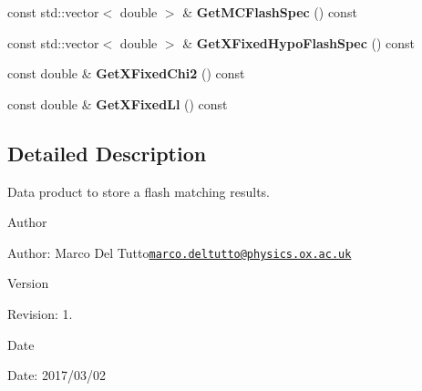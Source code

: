 \begin{DoxyCompactItemize}
\item 
\hypertarget{classubana_1_1FlashMatch_ad55287aa6f9ea080a5c875ea60090ae3}{const std\-::vector$<$ double $>$ \& {\bfseries Get\-M\-C\-Flash\-Spec} () const }\label{classubana_1_1FlashMatch_ad55287aa6f9ea080a5c875ea60090ae3}

\item 
\hypertarget{classubana_1_1FlashMatch_ad674b8ab8efe7f7850cdb5d689429907}{const std\-::vector$<$ double $>$ \& {\bfseries Get\-X\-Fixed\-Hypo\-Flash\-Spec} () const }\label{classubana_1_1FlashMatch_ad674b8ab8efe7f7850cdb5d689429907}

\item 
\hypertarget{classubana_1_1FlashMatch_a547468a6f20b51582c63bee251e327bd}{const double \& {\bfseries Get\-X\-Fixed\-Chi2} () const }\label{classubana_1_1FlashMatch_a547468a6f20b51582c63bee251e327bd}

\item 
\hypertarget{classubana_1_1FlashMatch_aced716901d42319db1d3054b31d22cc6}{const double \& {\bfseries Get\-X\-Fixed\-Ll} () const }\label{classubana_1_1FlashMatch_aced716901d42319db1d3054b31d22cc6}

\end{DoxyCompactItemize}


\subsection{Detailed Description}
Data product to store a flash matching results. 

\begin{DoxyAuthor}{Author}

\end{DoxyAuthor}
\begin{DoxyParagraph}{Author\-:}
Marco Del Tutto\href{mailto:marco.deltutto@physics.ox.ac.uk}{\tt marco.\-deltutto@physics.\-ox.\-ac.\-uk} 
\end{DoxyParagraph}


\begin{DoxyVersion}{Version}

\end{DoxyVersion}
\begin{DoxyParagraph}{Revision\-:}
1. 
\end{DoxyParagraph}


\begin{DoxyDate}{Date}

\end{DoxyDate}
\begin{DoxyParagraph}{Date\-:}
2017/03/02 
\end{DoxyParagraph}


